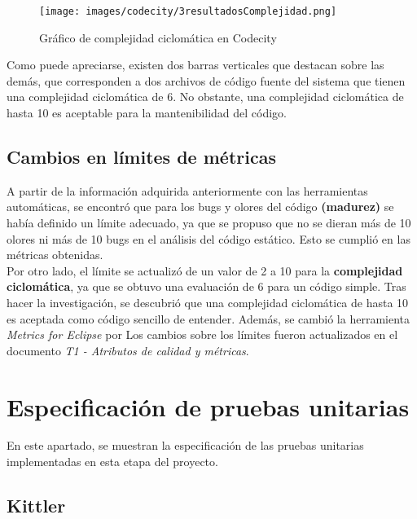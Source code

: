 \documentclass{scrreprt}
\begin{document}
\begin{figure}[H]
	\centering
    \texttt{[image: images/codecity/3resultadosComplejidad.png]}
    \caption{Gráfico de complejidad ciclomática en Codecity}
\end{figure}

Como puede apreciarse, existen dos barras verticales que destacan sobre las demás, que corresponden a dos archivos de código fuente del sistema que tienen una complejidad ciclomática de 6. No obstante, una complejidad ciclomática de hasta 10 es aceptable para la mantenibilidad del código.

\section{Cambios en límites de métricas}

A partir de la información adquirida anteriormente con las herramientas automáticas, se encontró que para los bugs y olores del código \textbf{(madurez)} se había definido un límite adecuado, ya que se propuso que no se dieran más de 10 olores ni más de 10 bugs en el análisis del código estático. Esto se cumplió en las métricas obtenidas.\\

Por otro lado, el límite se actualizó de un valor de 2 a 10 para la \textbf{complejidad ciclomática}, ya que se obtuvo una evaluación de 6 para un código simple. Tras hacer la investigación, se descubrió que una complejidad ciclomática de hasta 10 es aceptada como código sencillo de entender. Además, se cambió la herramienta \textit{Metrics for Eclipse} por  Los cambios sobre los límites fueron actualizados en el documento \textit{T1 - Atributos de calidad y métricas}.\\



\chapter{Especificación de pruebas unitarias}

En este apartado, se muestran la especificación de las pruebas unitarias implementadas en esta etapa del proyecto.

\section{Kittler}
\end{document}
